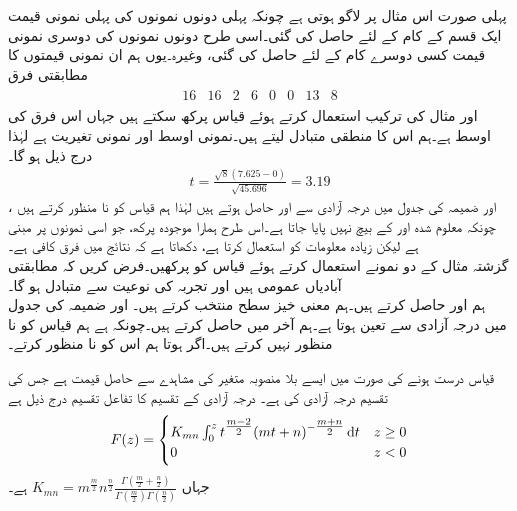 پہلی صورت اس مثال پر لاگو ہوتی ہے چونکہ پہلی دونوں نمونوں کی پہلی نمونی قیمت ایک قسم کے کام کے لئے حاصل کی گئی۔اسی طرح دونوں نمونوں کی دوسری نمونی قیمت کسی دوسرے کام کے لئے حاصل کی گئی، وغیرہ۔یوں ہم ان نمونی قیمتوں کا مطابقتی فرق
\begin{align*}
\begin{array}{rrrrrrrr}
16&16&2&6&0&0&13&8
\end{array}
\end{align*}
اور مثال  کی ترکیب استعمال کرتے ہوئے قیاس  پرکھ سکتے ہیں جہاں  اس فرق کی اوسط ہے۔ہم اس کا منطقی متبادل  لیتے ہیں۔نمونی اوسط  اور نمونی تغیریت  ہے لہٰذا درج ذیل ہو گا۔
\begin{align*}
t=\frac{\sqrt{8}(7.625-0)}{\sqrt{45.696}}=3.19
\end{align*}
،  اور ضمیمہ  کی جدول  میں  درجہ آزادی سے  اور  حاصل ہوتے ہیں لہٰذا ہم قیاس کو نا منظور کرتے ہیں چونکہ  معلوم شدہ  اور  کے بیچ نہیں پایا جاتا ہے۔اس طرح ہمارا موجودہ پرکھ، جو اسی نمونوں پر مبنی ہے لیکن زیادہ معلومات کو استعمال کرتا ہے، دکھاتا ہے کہ نتائج میں فرق کافی ہے۔ 
\quad {}\\
گزشتہ مثال کے دو نمونے استعمال کرتے ہوئے قیاس کو پرکھیں۔فرض کریں کہ مطابقتی آبادیاں عمومی ہیں اور تجربہ کی نوعیت سے متبادل  ہو گا۔\\
\quad
ہم  اور  حاصل کرتے ہیں۔ہم معنی خیز سطح  منتخب کرتے ہیں۔ اور ضمیمہ  کی جدول  میں  درجہ آزادی  سے  تعین ہوتا ہے۔ہم آخر میں  حاصل کرتے ہیں۔چونکہ  ہے ہم قیاس کو نا منظور نہیں کرتے ہیں۔اگر  ہوتا ہم اس کو نا منظور کرتے۔

قیاس درست ہونے کی صورت میں  ایسے بلا منصوبہ متغیر کی مشاہدے سے حاصل قیمت ہے جس کی تقسیم درجہ آزادی  کی   ہے۔   درجہ آزادی کے  تقسیم کا تفاعل تقسیم درج ذیل ہے
\begin{align}
F(z)=
\begin{cases}
K_{mn}\int_{0}^{z} t^{\tfrac{m-2}{2}} (mt+n)^{-\tfrac{m+n}{2}}\dif t& z\ge 0\\
0&z<0
\end{cases}
\end{align}
جہاں 
$K_{mn}=m^{\tfrac{m}{2}}n^{\tfrac{n}{2}}\tfrac{\Gamma(\tfrac{m}{2}+\tfrac{n}{2})}{\Gamma(\tfrac{m}{2})\Gamma(\tfrac{n}{2})}$
ہے۔

